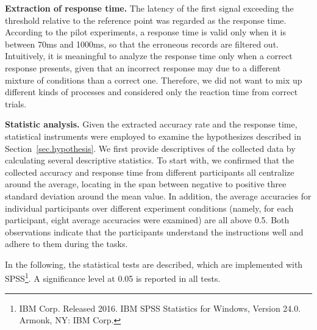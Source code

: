 \textbf{Extraction of response time.}
The latency of the first signal exceeding the 
threshold relative to the reference point was regarded as the response time.
According to the pilot experiments, 
a response time is valid only when it is between 70ms and 1000ms,
so that the erroneous records are filtered out. 
Intuitively, it is meaningful to analyze the 
response time only when a correct response presents, 
given that an incorrect response may due to a different mixture of conditions than a correct one.
Therefore, we did not want to mix up different kinds of processes and considered only the reaction time from correct trials.


\textbf{Statistic analysis.}
Given the extracted accuracy rate and the response time,  
statistical instruments were employed to examine the hypothesizes described in Section~\ref{sec.hypothesis}.
We first provide descriptives of the collected data by calculating 
several descriptive statistics. To start with, we confirmed that the collected accuracy and response time from different participants all centralize 
around the average, locating in the span between 
negative to positive
three standard deviation around the mean value. 
In addition, the average accuracies for individual participants over different experiment conditions (namely, for each participant, eight average accuracies were examined) are all above 0.5. Both observations indicate that
the participants understand the instructions well and adhere to them during the tasks.

In the following, the statistical tests are described, which are implemented with SPSS\footnote{IBM Corp. Released 2016. IBM SPSS Statistics for Windows, Version 24.0. Armonk, NY: IBM Corp.}. 
A significance level at 0.05 is reported in all tests.


